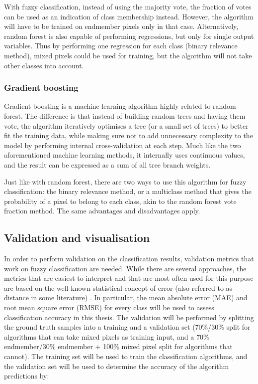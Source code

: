 \documentclass[a4paper,10pt]{article}
\begin{document}
With fuzzy classification, instead of using the majority vote, the fraction of votes can be used as an indication of class membership instead. However, the algorithm will have to be trained on endmember pixels only in that case. Alternatively, random forest is also capable of performing regressions, but only for single output variables. Thus by performing one regression for each class (binary relevance method), mixed pixels could be used for training, but the algorithm will not take other classes into account.

\subsubsection{Gradient boosting}

Gradient boosting is a machine learning algorithm highly related to random forest. The difference is that instead of building random trees and having them vote, the algorithm iteratively optimises a tree (or a small set of trees) to better fit the training data, while making sure not to add unnecessary complexity to the model by performing internal cross-validation at each step. Much like the two aforementioned machine learning methods, it internally uses continuous values, and the result can be expressed as a sum of all tree branch weights. \citep{friedman2001gradientboost}

Just like with random forest, there are two ways to use this algorithm for fuzzy classification: the binary relevance method, or a multiclass method that gives the probability of a pixel to belong to each class, akin to the random forest vote fraction method. The same advantages and disadvantages apply.

\subsection{Validation and visualisation}

In order to perform validation on the classification results, validation metrics that work on fuzzy classification are needed. While there are several approaches, the metrics that are easiest to interpret and that are most often used for this purpose are based on the well-known statistical concept of error (also referred to as distance in some literature) \citep{foody1996fuzzyevaluation}. In particular, the mean absolute error (MAE) and root mean square error (RMSE) for every class will be used to assess classification accuracy in this thesis. The validation will be performed by splitting the ground truth samples into a training and a validation set (70\%/30\% split for algorithms that can take mixed pixels as training input, and a 70\% endmember/30\% endmember + 100\% mixed pixel split for algorithms that cannot). The training set will be used to train the classification algorithms, and the validation set will be used to determine the accuracy of the algorithm predictions by:
\end{document}
